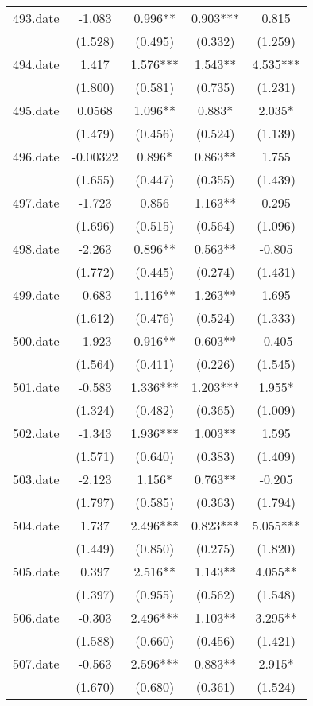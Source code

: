 \documentclass[]{article}
\begin{document}
\begin{tabular}{lcccc}
493.date & -1.083 & 0.996** & 0.903*** & 0.815 \\
 & (1.528) & (0.495) & (0.332) & (1.259) \\
494.date & 1.417 & 1.576*** & 1.543** & 4.535*** \\
 & (1.800) & (0.581) & (0.735) & (1.231) \\
495.date & 0.0568 & 1.096** & 0.883* & 2.035* \\
 & (1.479) & (0.456) & (0.524) & (1.139) \\
496.date & -0.00322 & 0.896* & 0.863** & 1.755 \\
 & (1.655) & (0.447) & (0.355) & (1.439) \\
497.date & -1.723 & 0.856 & 1.163** & 0.295 \\
 & (1.696) & (0.515) & (0.564) & (1.096) \\
498.date & -2.263 & 0.896** & 0.563** & -0.805 \\
 & (1.772) & (0.445) & (0.274) & (1.431) \\
499.date & -0.683 & 1.116** & 1.263** & 1.695 \\
 & (1.612) & (0.476) & (0.524) & (1.333) \\
500.date & -1.923 & 0.916** & 0.603** & -0.405 \\
 & (1.564) & (0.411) & (0.226) & (1.545) \\
501.date & -0.583 & 1.336*** & 1.203*** & 1.955* \\
 & (1.324) & (0.482) & (0.365) & (1.009) \\
502.date & -1.343 & 1.936*** & 1.003** & 1.595 \\
 & (1.571) & (0.640) & (0.383) & (1.409) \\
503.date & -2.123 & 1.156* & 0.763** & -0.205 \\
 & (1.797) & (0.585) & (0.363) & (1.794) \\
504.date & 1.737 & 2.496*** & 0.823*** & 5.055*** \\
 & (1.449) & (0.850) & (0.275) & (1.820) \\
505.date & 0.397 & 2.516** & 1.143** & 4.055** \\
 & (1.397) & (0.955) & (0.562) & (1.548) \\
506.date & -0.303 & 2.496*** & 1.103** & 3.295** \\
 & (1.588) & (0.660) & (0.456) & (1.421) \\
507.date & -0.563 & 2.596*** & 0.883** & 2.915* \\
 & (1.670) & (0.680) & (0.361) & (1.524) \\

\end{tabular}
\end{document}
